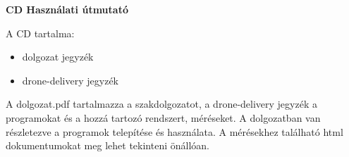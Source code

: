 \pagestyle{empty}

\noindent \textbf{\Large CD Használati útmutató}
%
%
%


A CD tartalma:
\begin{itemize}
\item dolgozat jegyzék
\item drone-delivery jegyzék
\end{itemize}
A dolgozat.pdf tartalmazza a szakdolgozatot, a drone-delivery jegyzék a programokat és a hozzá tartozó rendszert, méréseket.
A dolgozatban van részletezve a programok telepítése és használata.
A mérésekhez található html dokumentumokat meg lehet tekinteni önállóan.

